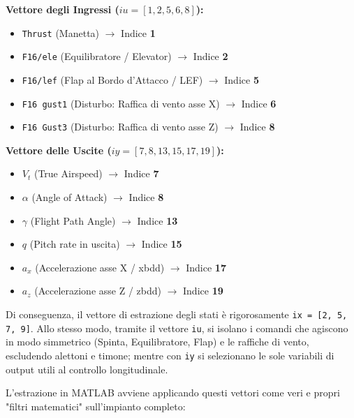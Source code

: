 \textbf{Vettore degli Ingressi ($iu = [1, 2, 5, 6, 8]$):}
\begin{itemize}
	\item \texttt{Thrust} (Manetta) $\rightarrow$ Indice \textbf{1}
	\item \texttt{F16/ele} (Equilibratore / Elevator) $\rightarrow$ Indice \textbf{2}
	\item \texttt{F16/lef} (Flap al Bordo d'Attacco / LEF) $\rightarrow$ Indice \textbf{5}
	\item \texttt{F16 gust1} (Disturbo: Raffica di vento asse X) $\rightarrow$ Indice \textbf{6}
	\item \texttt{F16 Gust3} (Disturbo: Raffica di vento asse Z) $\rightarrow$ Indice \textbf{8}
\end{itemize}

\vspace{0.3cm}

\textbf{Vettore delle Uscite ($iy = [7, 8, 13, 15, 17, 19]$):}
\begin{itemize}
	\item $V_t$ (True Airspeed) $\rightarrow$ Indice \textbf{7}
	\item $\alpha$ (Angle of Attack) $\rightarrow$ Indice \textbf{8}
	\item $\gamma$ (Flight Path Angle) $\rightarrow$ Indice \textbf{13}
	\item $q$ (Pitch rate in uscita) $\rightarrow$ Indice \textbf{15}
	\item $a_x$ (Accelerazione asse X / xbdd) $\rightarrow$ Indice \textbf{17}
	\item $a_z$ (Accelerazione asse Z / zbdd) $\rightarrow$ Indice \textbf{19}
\end{itemize}
Di conseguenza, il vettore di estrazione degli stati è rigorosamente \texttt{ix = [2, 5, 7, 9]}. Allo stesso modo, tramite il vettore \texttt{iu}, si isolano i comandi che agiscono in modo simmetrico (Spinta, Equilibratore, Flap) e le raffiche di vento, escludendo alettoni e timone; mentre con \texttt{iy} si selezionano le sole variabili di output utili al controllo longitudinale. 

L'estrazione in MATLAB avviene applicando questi vettori come veri e propri "filtri matematici" sull'impianto completo:

